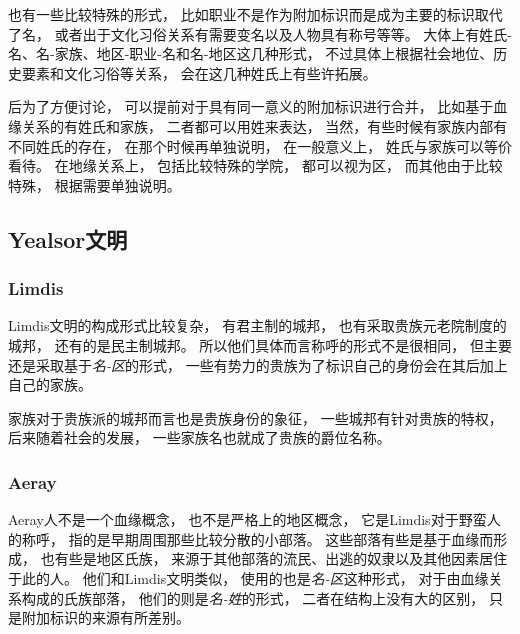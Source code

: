 \documentclass[UTF8,12pt,draft]{ctexbook}
\begin{document}
            也有一些比较特殊的形式，
            比如职业不是作为附加标识而是成为主要的标识取代了名，
            或者出于文化习俗关系有需要变名以及人物具有称号等等。
            大体上有姓氏-名、名-家族、地区-职业-名和名-地区这几种形式，
            不过具体上根据社会地位、历史要素和文化习俗等关系，
            会在这几种姓氏上有些许拓展。

            后为了方便讨论，
            可以提前对于具有同一意义的附加标识进行合并，
            比如基于血缘关系的有姓氏和家族，
            二者都可以用姓来表达，
            当然，有些时候有家族内部有不同姓氏的存在，
            在那个时候再单独说明，
            在一般意义上，
            姓氏与家族可以等价看待。
            在地缘关系上，
            包括比较特殊的学院，
            都可以视为区，
            而其他由于比较特殊，
            根据需要单独说明。
            \subsection{Yealsor文明}
                \subsubsection{Limdis}
                    Limdis文明的构成形式比较复杂，
                    有君主制的城邦，
                    也有采取贵族元老院制度的城邦，
                    还有的是民主制城邦。
                    所以他们具体而言称呼的形式不是很相同，
                    但主要还是采取基于\emph{名-区}的形式，
                    一些有势力的贵族为了标识自己的身份会在其后加上自己的家族。

                    家族对于贵族派的城邦而言也是贵族身份的象征，
                    一些城邦有针对贵族的特权，
                    后来随着社会的发展，
                    一些家族名也就成了贵族的爵位名称。
                \subsubsection{Aeray}
                    Aeray人不是一个血缘概念，
                    也不是严格上的地区概念，
                    它是Limdis对于野蛮人的称呼，
                    指的是早期周围那些比较分散的小部落。
                    这些部落有些是基于血缘而形成，
                    也有些是地区氏族，
                    来源于其他部落的流民、出逃的奴隶以及其他因素居住于此的人。
                    他们和Limdis文明类似，
                    使用的也是\emph{名-区}这种形式，
                    对于由血缘关系构成的氏族部落，
                    他们的则是\emph{名-姓}的形式，
                    二者在结构上没有大的区别，
                    只是附加标识的来源有所差别。
\end{document}
